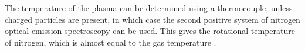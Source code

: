 \documentclass[11pt, oneside]{article}   	%
\begin{document}

The temperature of the plasma can be determined using a thermocouple, unless charged particles are present, in which case the second positive system of nitrogen optical emission spectroscopy can be used.
This gives the rotational temperature of nitrogen, which is almost equal to the gas temperature \cite{Twomey2011correlation}.




\end{document}
